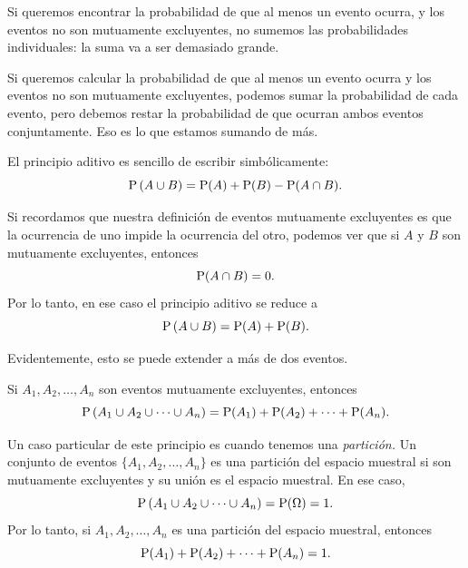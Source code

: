 \begin{remark}
	Si queremos encontrar la probabilidad de que al menos un evento ocurra, y los eventos no son mutuamente excluyentes, no sumemos las probabilidades individuales: la suma va a ser demasiado grande.
\end{remark}

\begin{definition}
Si queremos calcular la probabilidad de que al menos un evento ocurra y los eventos no son mutuamente excluyentes, podemos sumar la probabilidad de cada evento, pero debemos restar la probabilidad de que ocurran ambos eventos conjuntamente. Eso es lo que estamos sumando de más.
\end{definition}

\formal
El principio aditivo es sencillo de escribir simbólicamente: \[\operatorname{P}\left(A \cup B\right) = \operatorname{P}(A) + \operatorname{P}(B) - \operatorname{P}(A \cap B).\]

Si recordamos que nuestra definición de eventos mutuamente excluyentes es que la ocurrencia de uno impide la ocurrencia del otro, podemos ver que si \(A\) y \(B\) son mutuamente excluyentes, entonces \[\operatorname{P}(A \cap B) = 0.\] Por lo tanto, en ese caso el principio aditivo se reduce a \[\operatorname{P}\left(A \cup B\right) = \operatorname{P}(A) + \operatorname{P}(B).\]

Evidentemente, esto se puede extender a más de dos eventos. 
\begin{definition}
	Si \(A_1, A_2, \ldots, A_n\) son eventos mutuamente excluyentes, entonces \[\operatorname{P}\left(A_1 \cup A_2 \cup \cdots \cup A_n\right) = \operatorname{P}(A_1) + \operatorname{P}(A_2) + \cdots + \operatorname{P}(A_n).\]
\end{definition}

Un caso particular de este principio es cuando tenemos una \emph{partición.} Un conjunto de eventos \(\{A_1, A_2, \ldots, A_n\}\) es una partición del espacio muestral si son mutuamente excluyentes y su unión es el espacio muestral. En ese caso, \[\operatorname{P}\left(A_1 \cup A_2 \cup \cdots \cup A_n\right) = \operatorname{P}(\Omega) = 1.\] Por lo tanto, si \(A_1, A_2, \ldots, A_n\) es una partición del espacio muestral, entonces \[\operatorname{P}(A_1) + \operatorname{P}(A_2) + \cdots + \operatorname{P}(A_n) = 1.\]

\begin{center}
\end{center}
\informal


